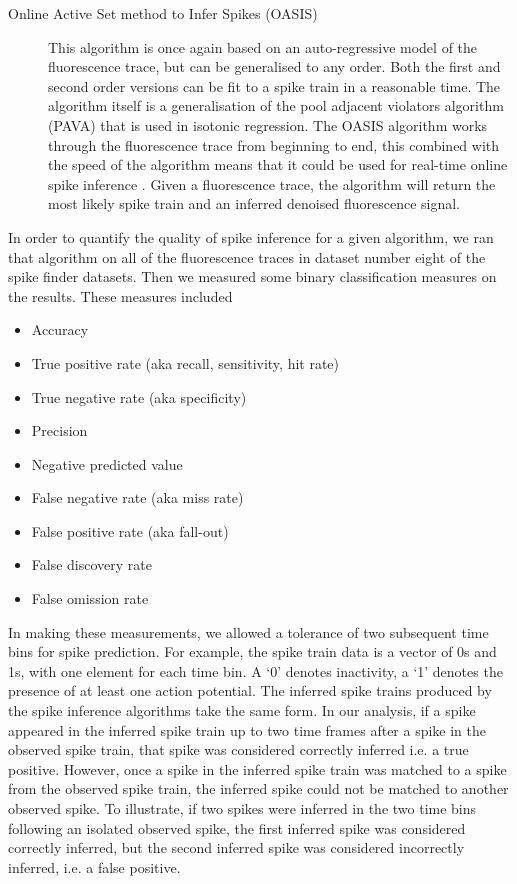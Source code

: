 \begin{description}
    \item[Online Active Set method to Infer Spikes (OASIS)] This algorithm is once again based on an auto-regressive model of the fluorescence trace, but can be generalised to any order. Both the first and second order versions can be fit to a spike train in a reasonable time. The algorithm itself is a generalisation of the pool adjacent violators algorithm (PAVA) that is used in isotonic regression. The OASIS algorithm works through the fluorescence trace from beginning to end, this combined with the speed of the algorithm means that it could be used for real-time online spike inference  \parencite{friedrich}. Given a fluorescence trace, the algorithm will return the most likely spike train and an inferred denoised fluorescence signal.
\end{description}
In order to quantify the quality of spike inference for a given algorithm, we ran that algorithm on all of the fluorescence traces in dataset number eight of the spike finder datasets. Then we measured some binary classification measures on the results. These measures included
\begin{itemize}
    \item Accuracy
    \item True positive rate (aka recall, sensitivity, hit rate)
    \item True negative rate (aka specificity)
    \item Precision
    \item Negative predicted value
    \item False negative rate (aka miss rate)
    \item False positive rate (aka fall-out)
    \item False discovery rate
    \item False omission rate
\end{itemize}
In making these measurements, we allowed a tolerance of two subsequent time bins for spike prediction. For example, the spike train data is a vector of 0s and 1s, with one element for each time bin. A `0' denotes inactivity, a `1' denotes the presence of at least one action potential. The inferred spike trains produced by the spike inference algorithms take the same form. In our analysis, if a spike appeared in the inferred spike train up to two time frames after a spike in the observed spike train, that spike was considered correctly inferred i.e. a true positive. However, once a spike in the inferred spike train was matched to a spike from the observed spike train, the inferred spike could not be matched to another observed spike. To illustrate, if two spikes were inferred in the two time bins following an isolated observed spike, the first inferred spike was considered correctly inferred, but the second inferred spike was considered incorrectly inferred, i.e. a false positive.

